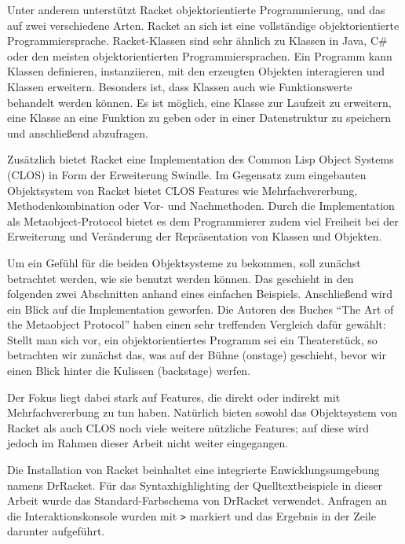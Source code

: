 Unter anderem unterstützt Racket objektorientierte Programmierung, und das auf zwei verschiedene Arten.  Racket an sich ist eine vollständige objektorientierte Programmiersprache. Racket-Klassen sind sehr ähnlich zu Klassen in Java, C\# oder den meisten objektorientierten Programmiersprachen\cite{neu-edu2}. Ein Programm kann Klassen definieren, instanziieren, mit den erzeugten Objekten interagieren und Klassen erweitern. Besonders ist, dass Klassen auch wie Funktionswerte behandelt werden können. Es ist möglich, eine Klasse zur Laufzeit zu erweitern, eine Klasse an eine Funktion zu geben oder in einer Datenstruktur zu speichern und anschließend abzufragen\cite{neu-edu}. 

Zusätzlich bietet Racket eine Implementation des Common Lisp Object Systems (CLOS) in Form der Erweiterung Swindle. Im Gegensatz zum eingebauten Objektsystem von Racket bietet CLOS Features wie Mehrfachvererbung, Methodenkombination oder Vor- und Nachmethoden. Durch die Implementation als Metaobject-Protocol bietet es dem Programmierer zudem viel Freiheit bei der Erweiterung und Veränderung der Repräsentation von Klassen und Objekten.

Um ein Gefühl für die beiden Objektsysteme zu bekommen, soll zunächst betrachtet werden, wie sie benutzt werden können. Das geschieht in den folgenden zwei Abschnitten anhand eines einfachen Beispiels. Anschließend wird ein Blick auf die Implementation geworfen. Die Autoren des Buches ``The Art of the Metaobject Protocol''\cite{amop} haben einen sehr treffenden Vergleich dafür gewählt: Stellt man sich vor, ein objektorientiertes Programm sei ein Theaterstück, so betrachten wir zunächst das, was auf der Bühne (onstage) geschieht, bevor wir einen Blick hinter die Kulissen (backstage) werfen.

Der Fokus liegt dabei stark auf Features, die direkt oder indirekt mit Mehrfachvererbung zu tun haben. Natürlich bieten sowohl das Objektsystem von Racket als auch CLOS noch viele weitere nützliche Features; auf diese wird jedoch im Rahmen dieser Arbeit nicht weiter eingegangen.

Die Installation von Racket beinhaltet eine integrierte Enwicklungsumgebung namens DrRacket. Für das Syntaxhighlighting der Quelltextbeispiele in dieser Arbeit wurde das Standard-Farbschema von DrRacket verwendet. Anfragen an die Interaktionskonsole wurden mit \texttt{>} markiert und das Ergebnis in der Zeile darunter aufgeführt. 